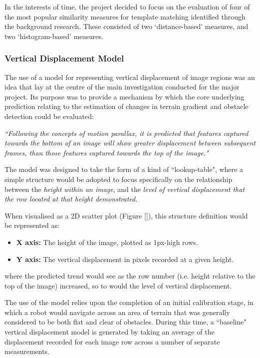 In the interests of time, the project decided to focus on the evaluation of four of the most popular similarity measures for template matching identified through the background research. These consisted of two `distance-based' measures, and two `histogram-based' measures.

\subsubsection{Vertical Displacement Model}
\label{hypo-model}

The use of a model for representing vertical displacement of image regions was an idea that lay at the centre of the main investigation conducted for the major project. Its purpose was to provide a mechanism by which the core underlying prediction relating to the estimation of changes in terrain gradient and obstacle detection could be evaluated:
	
	\indent \textit{``Following the concepts of motion parallax, it is predicted that features captured towards the bottom of an image will show greater displacement between subsequent frames, than those features captured towards the top of the image."}
	
The model was designed to take the form of a kind of ``lookup-table", where a simple structure would be adopted to focus specifically on the relationship between the \textit{height within an image}, and the \textit{level of vertical displacement that the row located at that height demonstrated}. 
 
 When visualised as a 2D scatter plot (Figure \ref{}), this structure definition would be represented as:
	
	\begin{itemize}
		\item \textbf{X axis:} The height of the image, plotted as 1px-high rows.
		\item \textbf{Y axis:} The vertical displacement in pixels recorded at a given height.
	\end{itemize}
	
	where the predicted trend would see as the row number (i.e. height relative to the top of the image) increased, so to would the level of vertical displacement.
	
The use of the model relies upon the completion of an initial calibration stage, in which a robot would navigate across an area of terrain that was generally considered to be both flat and clear of obstacles. During this time, a ``baseline" vertical displacement model is generated by taking an average of the displacement recorded for each image row across a number of separate measurements.
	
